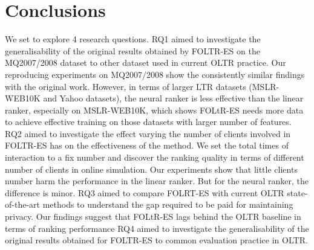 \section{Conclusions}

We set to explore 4 research questions. RQ1 aimed to investigate the generalisability of the original results obtained  by FOLTR-ES on the MQ2007/2008 dataset to other dataset used in current OLTR practice. Our reproducing experiments on MQ2007/2008 show the consistently similar findings with the original work. However, in terms of larger LTR datasets (MSLR-WEB10K and Yahoo datasets), the neural ranker is less effective than the linear ranker, especially on MSLR-WEB10K, which shows FOLtR-ES needs more data to achieve effective training on those datasets with larger number of features.
RQ2 aimed to investigate the effect varying the number of clients involved in FOLTR-ES has on the effectiveness of the method. We set the total times of interaction to a fix number and discover the ranking quality in terms of different number of clients in online simulation. Our experiments show that little clients number harm the performance in the linear ranker. But for the neural ranker, the difference is minor.
RQ3 aimed to compare FOLRT-ES with current OLTR state-of-the-art methods to understand the gap required to be paid for maintaining privacy. Our findings suggest that FOLtR-ES lags behind the OLTR baseline in terms of ranking performance
RQ4 aimed to investigate the generalisability of the original results obtained for FOLTR-ES to common evaluation practice in OLTR. 